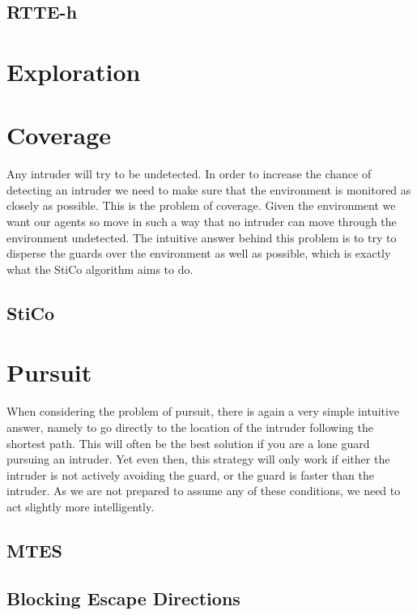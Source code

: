 \documentclass[a4paper]{report}
\begin{document}
		\subsection{RTTE-h}
			

	\section{Exploration}

	\section{Coverage}
		Any intruder will try to be undetected. In order to increase the chance of detecting an intruder we need to make sure that the environment is monitored as closely as possible. This is the problem of coverage. Given the environment we want our agents so move in such a way that no intruder can move through the environment undetected. The intuitive answer behind this problem is to try to disperse the guards over the environment as well as possible, which is exactly what the StiCo algorithm aims to do.
	
		\subsection{StiCo}
				

	\section{Pursuit}
		When considering the problem of pursuit, there is again a very simple intuitive answer, namely to go directly to the location of the intruder following the shortest path. This will often be the best solution if you are a lone guard pursuing an intruder. Yet even then, this strategy will only work if either the intruder is not actively avoiding the guard, or the guard is faster than the intruder. As we are not prepared to assume any of these conditions, we need to act slightly more intelligently.

		\subsection{MTES}
			

		\subsection{Blocking Escape Directions}
			
\end{document}
